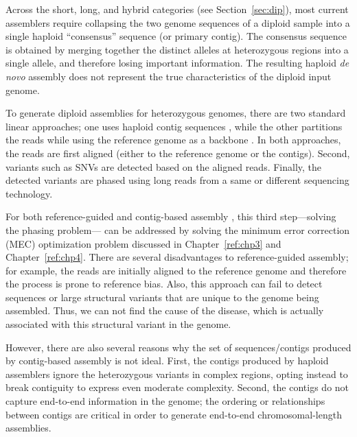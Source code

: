 Across the short, long, and hybrid categories (see Section~\ref{sec:dip}), most current assemblers \citep{sohn2016present, simpson2015theory} require collapsing the two genome sequences of a diploid sample into a single haploid ``consensus'' sequence (or primary contig). 
The consensus sequence is obtained by merging together the distinct alleles at heterozygous regions into a single allele, and therefore losing important information.
The resulting haploid \textit{de novo} assembly does not represent the true characteristics of the diploid input genome. 

To generate diploid assemblies for heterozygous genomes, there are two standard linear approaches; 
one uses haploid contig sequences \citep{chin2016phased, pendleton2015assembly, seo2016novo, mostovoy2016hybrid}, 
while the other partitions the reads while using the reference genome as a backbone \citep{Glusman2014, martin2016whatshap, chaisson2017multi}.
In both approaches, the reads are first aligned (either to the reference genome or the contigs). Second, variants such as SNVs are detected based on the aligned reads. 
Finally, the detected variants are phased using long reads from a same or different sequencing technology.

For both reference-guided and contig-based assembly , this third step---solving the phasing problem--- can be addressed by solving the minimum error correction (MEC) optimization problem discussed in Chapter~\ref{ref:chp3} and Chapter~\ref{ref:chp4}.
There are several disadvantages to reference-guided assembly; for example, the reads are initially aligned to the reference genome and therefore the process is prone to reference bias. 
Also, this approach can fail to detect sequences or large structural variants that are unique to the genome being assembled. 
Thus, we can not find the cause of the disease, which is actually associated with this structural variant in the genome.

However, there are also several reasons why the set of sequences/contigs produced by contig-based assembly is not ideal.
First, the contigs produced by haploid assemblers ignore the heterozygous variants in complex regions, opting instead to break contiguity to express even moderate complexity. 
Second, the contigs do not capture end-to-end information in the genome; the ordering or relationships between contigs are critical in order to generate end-to-end chromosomal-length assemblies.

